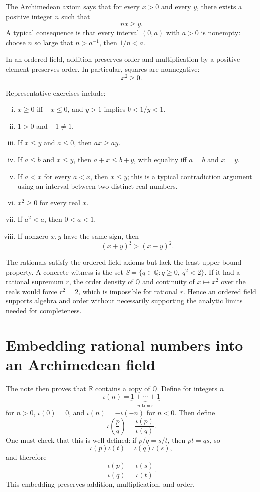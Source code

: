 The Archimedean axiom says that for every \(x>0\) and every \(y\), there exists a positive integer \(n\) such that
\[
  nx\ge y.
\]
A typical consequence is that every interval \((0,a)\) with \(a>0\) is nonempty: choose \(n\) so large that \(n>a^{-1}\), then \(1/n<a\).

\begin{proposition}
In an ordered field, addition preserves order and multiplication by a positive element preserves order.  In particular, squares are nonnegative:
\[
  x^2\ge0.
\]
\end{proposition}


Representative exercises include:
\begin{enumerate}[(i)]
  \item \(x\ge0\) iff \(-x\le0\), and \(y>1\) implies \(0<1/y<1\).
  \item \(1>0\) and \(-1\neq1\).
  \item If \(x\le y\) and \(a\le0\), then \(ax\ge ay\).
  \item If \(a\le b\) and \(x\le y\), then \(a+x\le b+y\), with equality iff \(a=b\) and \(x=y\).
  \item If \(a<x\) for every \(a<x\), then \(x\le y\); this is a typical contradiction argument using an interval between two distinct real numbers.
  \item \(x^2\ge0\) for every real \(x\).
  \item If \(a^2<a\), then \(0<a<1\).
  \item If nonzero \(x,y\) have the same sign, then
  \[
    (x+y)^2>(x-y)^2.
  \]
\end{enumerate}

The rationals satisfy the ordered-field axioms but lack the least-upper-bound property. A concrete witness is the set \(S=\{q\in\mathbb Q:q\ge0,\ q^2<2\}\). If it had a rational supremum \(r\), the order density of \(\mathbb Q\) and continuity of \(x\mapsto x^2\) over the reals would force \(r^2=2\), which is impossible for rational \(r\). Hence an ordered field supports algebra and order without necessarily supporting the analytic limits needed for completeness.

\section{Embedding rational numbers into an Archimedean field}

The note then proves that \(\mathbb R\) contains a copy of \(\mathbb Q\).  Define for integers \(n\)
\[
  \iota(n)=\underbrace{1+\cdots+1}_{n\text{ times}}
\]
for \(n>0\), \(\iota(0)=0\), and \(\iota(n)=-\iota(-n)\) for \(n<0\).  Then define
\[
  \iota\left(\frac pq\right)=\frac{\iota(p)}{\iota(q)}.
\]
One must check that this is well-defined: if \(p/q=s/t\), then \(pt=qs\), so
\[
  \iota(p)\iota(t)=\iota(q)\iota(s),
\]
and therefore
\[
  \frac{\iota(p)}{\iota(q)}=\frac{\iota(s)}{\iota(t)}.
\]
This embedding preserves addition, multiplication, and order.


